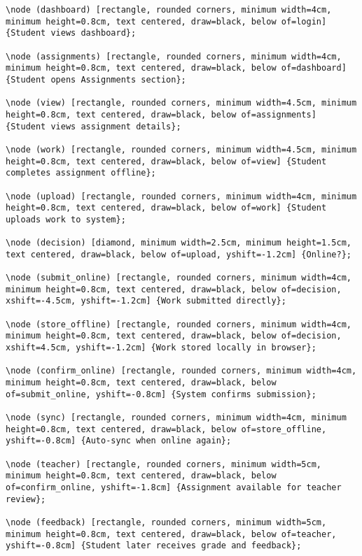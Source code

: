 \documentclass[11pt]{report}
\begin{document}
\begin{verbatim}
\node (dashboard) [rectangle, rounded corners, minimum width=4cm, minimum height=0.8cm, text centered, draw=black, below of=login] {Student views dashboard};

\node (assignments) [rectangle, rounded corners, minimum width=4cm, minimum height=0.8cm, text centered, draw=black, below of=dashboard] {Student opens Assignments section};

\node (view) [rectangle, rounded corners, minimum width=4.5cm, minimum height=0.8cm, text centered, draw=black, below of=assignments] {Student views assignment details};

\node (work) [rectangle, rounded corners, minimum width=4.5cm, minimum height=0.8cm, text centered, draw=black, below of=view] {Student completes assignment offline};

\node (upload) [rectangle, rounded corners, minimum width=4cm, minimum height=0.8cm, text centered, draw=black, below of=work] {Student uploads work to system};

\node (decision) [diamond, minimum width=2.5cm, minimum height=1.5cm, text centered, draw=black, below of=upload, yshift=-1.2cm] {Online?};

\node (submit_online) [rectangle, rounded corners, minimum width=4cm, minimum height=0.8cm, text centered, draw=black, below of=decision, xshift=-4.5cm, yshift=-1.2cm] {Work submitted directly};

\node (store_offline) [rectangle, rounded corners, minimum width=4cm, minimum height=0.8cm, text centered, draw=black, below of=decision, xshift=4.5cm, yshift=-1.2cm] {Work stored locally in browser};

\node (confirm_online) [rectangle, rounded corners, minimum width=4cm, minimum height=0.8cm, text centered, draw=black, below of=submit_online, yshift=-0.8cm] {System confirms submission};

\node (sync) [rectangle, rounded corners, minimum width=4cm, minimum height=0.8cm, text centered, draw=black, below of=store_offline, yshift=-0.8cm] {Auto-sync when online again};

\node (teacher) [rectangle, rounded corners, minimum width=5cm, minimum height=0.8cm, text centered, draw=black, below of=confirm_online, yshift=-1.8cm] {Assignment available for teacher review};

\node (feedback) [rectangle, rounded corners, minimum width=5cm, minimum height=0.8cm, text centered, draw=black, below of=teacher, yshift=-0.8cm] {Student later receives grade and feedback};


\end{verbatim}
\end{document}
